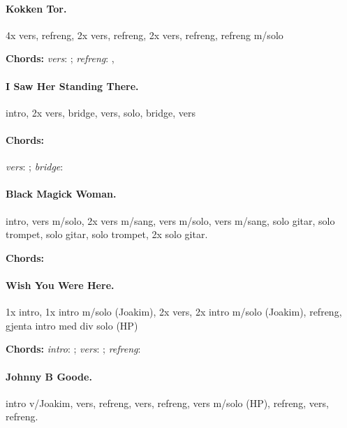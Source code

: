 \documentclass[%
twoside,                 %
final,                   %
10pt]{article}
\begin{document}
\paragraph{Kokken Tor.}
4x vers, refreng, 2x vers, refreng, 2x vers, refreng, refreng m/solo

\textbf{Chords:} \emph{vers}: ;
\emph{refreng}: , 





\paragraph{I Saw Her Standing There.}
intro, 2x vers, bridge, vers, solo, bridge, vers

\paragraph{Chords:}
\emph{vers}: ; \emph{bridge}: 









\paragraph{Black Magick Woman.}
intro, vers m/solo, 2x vers m/sang, vers m/solo, vers m/sang, solo gitar, solo trompet, solo gitar, solo trompet, 2x solo gitar.

\textbf{Chords:} 






\paragraph{Wish You Were Here.}
1x intro, 1x intro m/solo (Joakim), 2x vers, 2x intro m/solo (Joakim), refreng,
gjenta intro med div solo (HP)


\textbf{Chords:} \emph{intro}: ;
\emph{vers}: ; \emph{refreng}: 





\paragraph{Johnny B Goode.}
intro v/Joakim, vers, refreng, vers, refreng, vers m/solo (HP), refreng,
vers, refreng.
\end{document}
